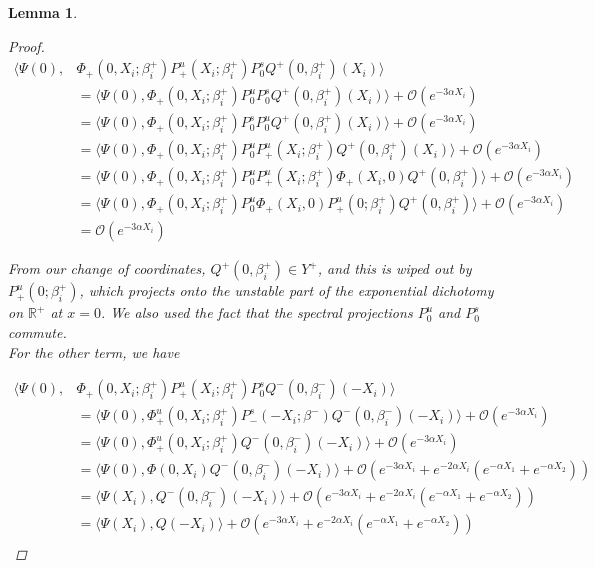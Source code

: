 \documentclass[12pt]{article}
\def\R{{\mathbb R}}
\newtheorem{lemma}{Lemma}
\begin{document}
\begin{lemma}
\begin{proof}
\begin{align*}
\langle \Psi(0), &\Phi_+(0, X_i; \beta_i^+) P^u_+(X_i; \beta_i^+) P^s_0 Q^+(0, \beta_i^+)(X_i) \rangle \\
&= \langle \Psi(0), \Phi_+(0, X_i; \beta_i^+) P^u_0 P^s_0 Q^+(0, \beta_i^+)(X_i) \rangle + \mathcal{O}(e^{-3 \alpha X_i}) \\
&= \langle \Psi(0), \Phi_+(0, X_i; \beta_i^+) P^s_0 P^u_0 Q^+(0, \beta_i^+)(X_i) \rangle + \mathcal{O}(e^{-3 \alpha X_i}) \\
&= \langle \Psi(0), \Phi_+(0, X_i; \beta_i^+) P^u_0 P^u_+(X_i; \beta_i^+) Q^+(0, \beta_i^+)(X_i) \rangle + \mathcal{O}(e^{-3 \alpha X_i}) \\
&= \langle \Psi(0), \Phi_+(0, X_i; \beta_i^+) P^u_0 P^u_+(X_i; \beta_i^+) \Phi_+(X_i, 0) Q^+(0, \beta_i^+)\rangle + \mathcal{O}(e^{-3 \alpha X_i}) \\
&= \langle \Psi(0), \Phi_+(0, X_i; \beta_i^+) P^u_0 \Phi_+(X_i, 0) P^u_+(0; \beta_i^+) Q^+(0, \beta_i^+)\rangle + \mathcal{O}(e^{-3 \alpha X_i}) \\
&= \mathcal{O}(e^{-3 \alpha X_i})
\end{align*}

From our change of coordinates, $Q^+(0, \beta_i^+) \in Y^+$, and this is wiped out by $P^u_+(0; \beta_i^+)$, which projects onto the unstable part of the exponential dichotomy on $\R^+$ at $x = 0$. We also used the fact that the spectral projections $P^u_0$ and $P^s_0$ commute. \\

For the other term, we have

\begin{align*}
\langle \Psi(0), &\Phi_+(0, X_i; \beta_i^+) P^u_+(X_i; \beta_i^+) P^s_0 Q^-(0, \beta_i^-)(-X_i) \rangle \\
&= \langle \Psi(0), \Phi_+^u(0, X_i; \beta_i^+) P^s_-(-X_i; \beta^-) Q^-(0, \beta_i^-)(-X_i) \rangle + \mathcal{O}(e^{-3 \alpha X_i}) \\
&= \langle \Psi(0), \Phi_+^u(0, X_i; \beta_i^+) Q^-(0, \beta_i^-)(-X_i) \rangle + \mathcal{O}(e^{-3 \alpha X_i}) \\
&= \langle \Psi(0), \Phi(0, X_i) Q^-(0, \beta_i^-)(-X_i) \rangle + \mathcal{O}(e^{-3 \alpha X_i} + e^{-2 \alpha X_i} (e^{-\alpha X_1} + e^{-\alpha X_2})) \\
&= \langle \Psi(X_i), Q^-(0, \beta_i^-)(-X_i) \rangle + \mathcal{O}(e^{-3 \alpha X_i} + e^{-2 \alpha X_i} (e^{-\alpha X_1} + e^{-\alpha X_2})) \\
&= \langle \Psi(X_i), Q(-X_i) \rangle + \mathcal{O}(e^{-3 \alpha X_i} + e^{-2 \alpha X_i} (e^{-\alpha X_1} + e^{-\alpha X_2})) \\
\end{align*}


\end{proof}
\end{lemma}
\end{document}
